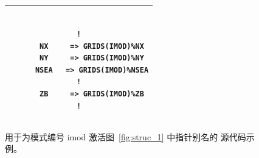 \begin{figure}
\begin{center} \begin{tabular}{|c|} \hline
\begin{minipage}[t]{4.5in}
\begin{verbatim}

!
      NX     => GRIDS(IMOD)%NX
      NY     => GRIDS(IMOD)%NY
      NSEA   => GRIDS(IMOD)%NSEA
!
      ZB     => GRIDS(IMOD)%ZB
!

\end{verbatim}
\end{minipage} \\ \hline
\end{tabular} \end{center}

\caption{用于为模式编号 {\F imod} 激活图~\ref{fig:struc_1} 中指针别名的
源代码示例。}
\label{fig:struc_2}

\botline
\end{figure}

